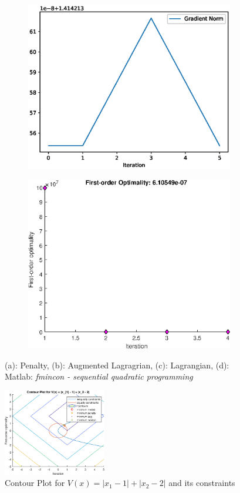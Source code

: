 \begin{figure}[h!]
\begin{subfigure}[t]{0.4\textwidth}
\centering
    \includegraphics[width=\textwidth]{images/python/al-pD-ln.eps}
    \caption{}
\end{subfigure}
\hfill
\begin{subfigure}[t]{0.4\textwidth}
\centering
    \includegraphics[width=\textwidth]{images/matlab/2a_loss.eps}
    \caption{}
\end{subfigure}
\caption{(a): Penalty, (b): Augmented Lagragrian, (c): Lagrangian, (d): Matlab: \textit{fmincon - sequential quadratic programming}}
\end{figure}
\begin{figure}
    \centering
    \includegraphics[width=0.4\textwidth]{images/matlab/matlab_2a.eps}
    \caption{Contour Plot for $V(x) =  | x_1 -1 | + | x_2 - 2 |$ and its constraints}
\end{figure}
